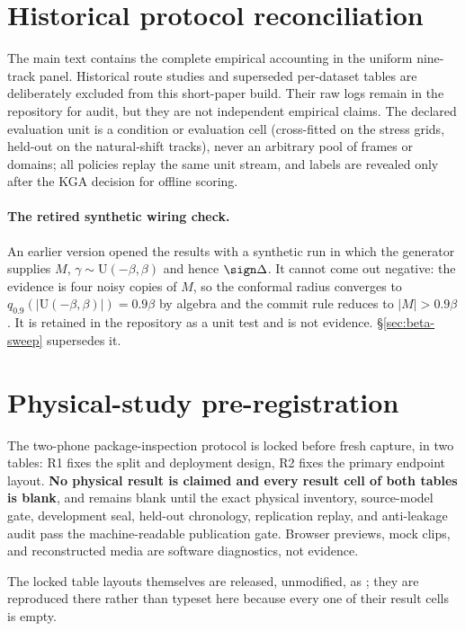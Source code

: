 \section{Historical protocol reconciliation}\label{app:supp-exp}
The main text contains the complete empirical accounting in the uniform nine-track panel.
Historical route studies and superseded per-dataset tables are deliberately excluded from this
short-paper build. Their raw logs remain in the repository for
audit, but they are not independent empirical claims. The declared evaluation unit is a condition
or evaluation cell (cross-fitted on the stress grids, held-out on the natural-shift tracks), never
an arbitrary pool of frames or domains; all policies replay the same unit
stream, and labels are revealed only after the KGA decision for offline scoring.

\paragraph{The retired synthetic wiring check.} An earlier version opened the results with a
synthetic run in which the generator supplies $M$, $\gamma\sim\mathrm U(-\beta,\beta)$ and hence
$\sign\Delta$. It cannot come out negative: the evidence is four noisy copies of $M$, so the
conformal radius converges to $q_{0.9}(|\mathrm U(-\beta,\beta)|)=0.9\beta$ by algebra and the
commit rule reduces to $|M|>0.9\beta$. It is retained in the repository as a unit test and is not
evidence. \S\ref{sec:beta-sweep} supersedes it.


\section{Physical-study pre-registration}\label{app:edge-physical}
The two-phone package-inspection protocol is locked before fresh capture, in two tables: R1 fixes
the split and deployment design, R2 fixes the primary endpoint layout. \textbf{No physical result is
claimed and every result cell of both tables is blank}, and remains blank until the exact physical
inventory, source-model gate, development seal, held-out chronology, replication replay, and
anti-leakage audit pass the machine-readable publication gate. Browser previews, mock clips, and
reconstructed media are software diagnostics, not evidence.

The locked table layouts themselves are released, unmodified, as
; they are reproduced there rather
than typeset here because every one of their result cells is empty.

